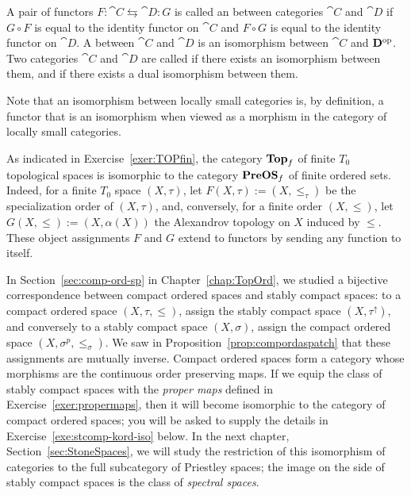 \begin{definition}\label{dfn:iso-between-cats}
A pair of functors $F \colon \cat{C} \leftrightarrows \cat{D} \colon G$ is called an  between categories $\cat{C}$ and $\cat{D}$ if $G \circ F$ is equal to the identity functor on $\cat{C}$ and $F \circ G$ is equal to the identity functor on $\cat{D}$.
A  between $\cat{C}$ and $\cat{D}$ is an isomorphism between $\cat{C}$ and $\mathbf{D}^{\mathrm{op}}$. 
Two categories $\cat{C}$ and $\cat{D}$ are called  if there exists an isomorphism between them, and  if there exists a dual isomorphism between them.
\end{definition}
Note that an isomorphism between locally small categories is, by definition, a functor that is an isomorphism when viewed as a morphism in the category of locally small categories.

\begin{example}\label{exa:topfiniso}
As indicated in Exercise~\ref{exer:TOPfin}, the category $\mathbf{Top}_f$ of finite $T_0$ topological spaces is isomorphic to the category $\mathbf{PreOS}_f$ of finite ordered sets. Indeed, for a finite $T_0$ space $(X,\tau)$, let $F(X,\tau) := (X,\leq_{\tau})$ be the specialization order of $(X,\tau)$, and, conversely, for a finite order $(X,\leq)$, let $G(X,\leq) := (X,\alpha(X))$ the Alexandrov topology on $X$ induced by $\leq$. These object assignments $F$ and $G$ extend to functors by sending any function to itself.
\end{example}

\begin{example}\label{exa:stcomp-kord-iso}
In Section~\ref{sec:comp-ord-sp} in Chapter~\ref{chap:TopOrd}, we studied a bijective correspondence between compact ordered spaces and stably compact spaces: to a compact ordered space $(X, \tau, \leq)$, assign the stably compact space $(X, \tau^{\uparrow})$, and conversely to a stably compact space $(X,\sigma)$, assign the compact ordered space $(X,\sigma^p,\leq_\sigma)$. We saw in Proposition~\ref{prop:compordaspatch} that these assignments are mutually inverse. Compact ordered spaces form a category whose morphisms are the continuous order preserving maps. If we equip the class of stably compact spaces with the \emph{proper maps} defined in Exercise~\ref{exer:propermaps}, then it will become isomorphic to the category of compact ordered spaces; you will be asked to supply the details in Exercise~\ref{exe:stcomp-kord-iso} below. In the next chapter, Section~\ref{sec:StoneSpaces}, we will study the restriction of this isomorphism of categories to the full subcategory of Priestley spaces; the image on the side of stably compact spaces is the class of \emph{spectral spaces}.
\end{example}


